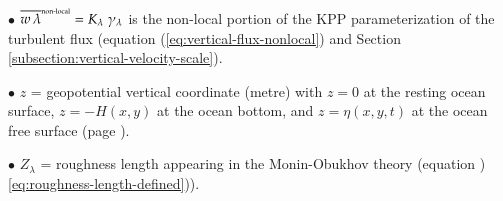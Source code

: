 \begin{mdframed}[backgroundcolor=lightgray!50]
\begin{trivlist}
\item[$\bullet$] $\overline{w \, \lambda}^{\mbox{\tiny non-local}} = K_{\lambda}
  \; \gamma_{\lambda}$ is the non-local portion of the KPP
  parameterization of the turbulent flux (equation
  (\ref{eq:vertical-flux-nonlocal}) and Section
  \ref{subsection:vertical-velocity-scale}).

\item[$\bullet$] $z$ = geopotential vertical coordinate (metre) with $z=0$ at the
  resting ocean surface, $z=-H(x,y)$ at the ocean bottom, and
  $z=\eta(x,y,t)$ at the ocean free surface (page
  \pageref{geopotential_defined}).

\item[$\bullet$] $Z_{\lambda}$ = roughness length appearing in the
    Monin-Obukhov theory (equation
    )\ref{eq:roughness-length-defined})).

\end{trivlist}  
\end{mdframed}





